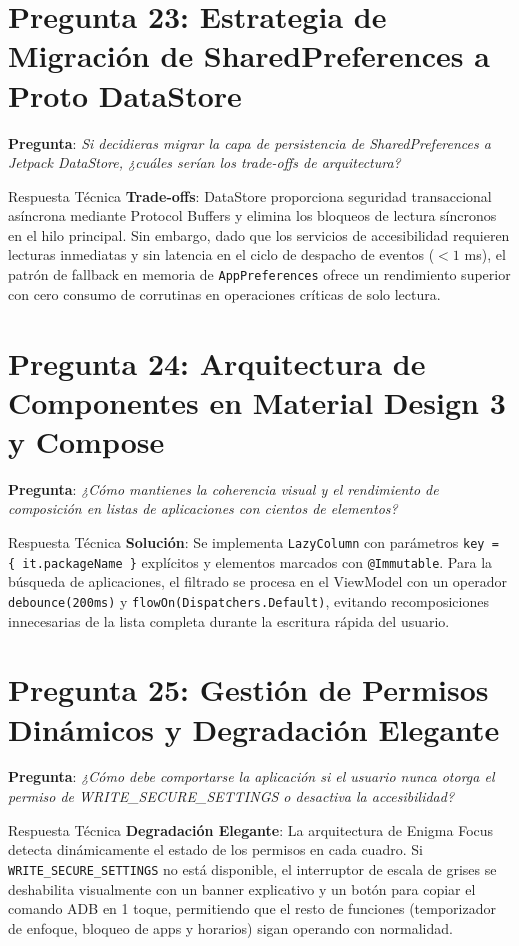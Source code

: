 \documentclass[11pt,a4paper,oneside]{report}
\begin{document}
\section{Pregunta 23: Estrategia de Migración de SharedPreferences a Proto DataStore}
\textbf{Pregunta}: \textit{Si decidieras migrar la capa de persistencia de SharedPreferences a Jetpack DataStore, ¿cuáles serían los trade-offs de arquitectura?}
\begin{starbox}{Respuesta Técnica}
\textbf{Trade-offs}: DataStore proporciona seguridad transaccional asíncrona mediante Protocol Buffers y elimina los bloqueos de lectura síncronos en el hilo principal. Sin embargo, dado que los servicios de accesibilidad requieren lecturas inmediatas y sin latencia en el ciclo de despacho de eventos ($<1$ ms), el patrón de fallback en memoria de \texttt{AppPreferences} ofrece un rendimiento superior con cero consumo de corrutinas en operaciones críticas de solo lectura.
\end{starbox}

\section{Pregunta 24: Arquitectura de Componentes en Material Design 3 y Compose}
\textbf{Pregunta}: \textit{¿Cómo mantienes la coherencia visual y el rendimiento de composición en listas de aplicaciones con cientos de elementos?}
\begin{starbox}{Respuesta Técnica}
\textbf{Solución}: Se implementa \texttt{LazyColumn} con parámetros \texttt{key = \{ it.packageName \}} explícitos y elementos marcados con \texttt{@Immutable}. Para la búsqueda de aplicaciones, el filtrado se procesa en el ViewModel con un operador \texttt{debounce(200ms)} y \texttt{flowOn(Dispatchers.Default)}, evitando recomposiciones innecesarias de la lista completa durante la escritura rápida del usuario.
\end{starbox}

\section{Pregunta 25: Gestión de Permisos Dinámicos y Degradación Elegante}
\textbf{Pregunta}: \textit{¿Cómo debe comportarse la aplicación si el usuario nunca otorga el permiso de WRITE\_SECURE\_SETTINGS o desactiva la accesibilidad?}
\begin{starbox}{Respuesta Técnica}
\textbf{Degradación Elegante}: La arquitectura de Enigma Focus detecta dinámicamente el estado de los permisos en cada cuadro. Si \texttt{WRITE\_SECURE\_SETTINGS} no está disponible, el interruptor de escala de grises se deshabilita visualmente con un banner explicativo y un botón para copiar el comando ADB en 1 toque, permitiendo que el resto de funciones (temporizador de enfoque, bloqueo de apps y horarios) sigan operando con normalidad.
\end{starbox}
\end{document}
